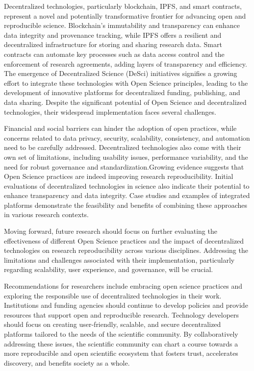 \documentclass{article}
\begin{document}
Decentralized technologies, particularly blockchain, IPFS, and smart contracts, represent a novel and potentially transformative frontier for advancing open and reproducible science. Blockchain's immutability and transparency can enhance data integrity and provenance tracking, while IPFS offers a resilient and decentralized infrastructure for storing and sharing research data. Smart contracts can automate key processes such as data access control and the enforcement of research agreements, adding layers of transparency and efficiency. The emergence of Decentralized Science (DeSci) initiatives signifies a growing effort to integrate these technologies with Open Science principles, leading to the development of innovative platforms for decentralized funding, publishing, and data sharing. Despite the significant potential of Open Science and decentralized technologies, their widespread implementation faces several challenges.

Financial and social barriers can hinder the adoption of open practices, while concerns related to data privacy, security, scalability, consistency, and automation need to be carefully addressed. Decentralized technologies also come with their own set of limitations, including usability issues, performance variability, and the need for robust governance and standardization.Growing evidence suggests that Open Science practices are indeed improving research reproducibility. Initial evaluations of decentralized technologies in science also indicate their potential to enhance transparency and data integrity. Case studies and examples of integrated platforms demonstrate the feasibility and benefits of combining these approaches in various research contexts.

Moving forward, future research should focus on further evaluating the effectiveness of different Open Science practices and the impact of decentralized technologies on research reproducibility across various disciplines. Addressing the limitations and challenges associated with their implementation, particularly regarding scalability, user experience, and governance, will be crucial.

Recommendations for researchers include embracing open science practices and exploring the responsible use of decentralized technologies in their work. Institutions and funding agencies should continue to develop policies and provide resources that support open and reproducible research. Technology developers should focus on creating user-friendly, scalable, and secure decentralized platforms tailored to the needs of the scientific community. By collaboratively addressing these issues, the scientific community can chart a course towards a more reproducible and open scientific ecosystem that fosters trust, accelerates discovery, and benefits society as a whole.
\end{document}
